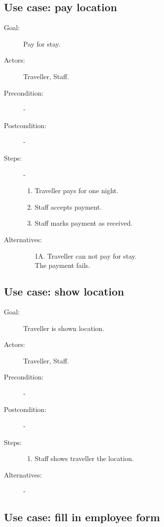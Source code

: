 \subsection{Use case: pay location}

\begin{description}
\item[Goal:] Pay for stay.
\item[Actors:] Traveller, Staff.
\item[Precondition:] -
\item[Postcondition:] -
\item[Steps:] -
\begin{enumerate}
\item Traveller pays for one night.
\item Staff accepts payment.
\item Staff marks payment as received.
\end{enumerate}

\item[Alternatives:]
\begin{enumerate}
\item[1A.] Traveller can not pay for stay.\\
The payment fails.
\end{enumerate}
\end{description}

\subsection{Use case: show location}

\begin{description}
\item[Goal:] Traveller is shown location.
\item[Actors:] Traveller, Staff.
\item[Precondition:] -
\item[Postcondition:] -
\item[Steps:] 
\begin{enumerate}
\item Staff shows traveller the location.
\end{enumerate}

\item[Alternatives:] -
\end{description}

\subsection{Use case: fill in employee form}

